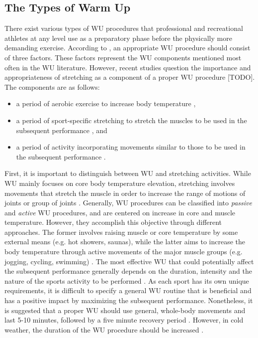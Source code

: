 \subsection{The Types of Warm Up}
There exist various types of WU procedures that professional and recreational athletes at any level use as a preparatory phase before the physically more demanding exercise. According to \cite{safran1989warm}, an appropriate WU procedure should consist of three factors. These factors represent the WU components mentioned most often in the WU literature. However, recent studies question the importance and appropriateness of stretching as a component of a proper WU procedure [TODO]. The components are as follows:
\begin{itemize}
\item a period of aerobic exercise to increase body
temperature \cite{safran1989warm},
\item a period of sport-specific stretching to stretch 
the muscles to be used in the subsequent
performance \cite{safran1989warm}, and
\item a period of activity incorporating movements
similar to those to be used in the subsequent
performance \cite{safran1989warm}.
\end{itemize}  
First, it is important to distinguish between WU and stretching activities. While WU mainly focuses on core body temperature elevation, stretching involves movements that stretch the muscle in order to increase the range of motions of joints or group of joints \cite{knudson2008warm}. 
Generally, WU procedures can be classified into \textit{passive} and \textit{active} WU procedures, and are centered on increase in core and muscle temperature. However, they accomplish this objective through different approaches. The former involves raising muscle or core temperature by some external means (e.g. hot showers, saunas), while the latter aims to increase the body temperature through active movements of the major muscle groups (e.g. jogging, cycling, swimming) \cite{bishop2003warm2, shellock1985warming}. The most effective WU that could potentially affect the subsequent performance generally depends on the duration, intensity and the nature of the sports activity to be performed \cite{bishop2003warm2}. As each sport has its own unique requirements, it is difficult to specify a general WU routine that is beneficial and has a positive impact by maximizing the subsequent performance. Nonetheless, it is suggested that a proper WU should use general, whole-body movements and last 5-10 minutes, followed by a five minute recovery period \cite{bishop2003warm2}. However, in cold weather, the duration of the WU procedure should be increased \cite{mayr2015prevention}. %

